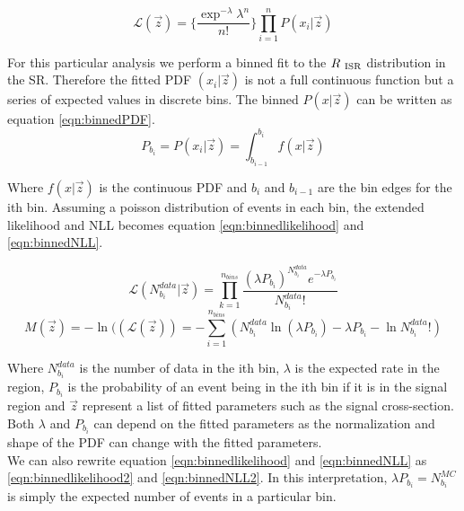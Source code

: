 \begin{equation}
\label{eqn:ExtLikelihood}
{\mathcal{L}}(\vec{z}) = \{ \frac{\exp^{-\lambda}{\lambda}^n}{n!} \}  {\displaystyle\prod_{i=1}^{n}} P(x_i|\vec{z})
\end{equation}

\indent For this particular analysis we perform a binned fit to the $R_{~\mathrm{ISR}}$ distribution in the SR.  Therefore the fitted PDF $(x_i|\vec{z})$ is not a full continuous function but a series of expected values in discrete bins.  The binned $P(x|\vec{z})$ can be written as equation \ref{eqn:binnedPDF}. \\

\begin{equation}
\label{eqn:binnedPDF}
P_{b_i} = P(x_i|\vec{z}) = \int^{b_i}_{b_{i-1}} f(x|\vec{z})
\end{equation}

Where $f(x|\vec{z})$ is the continuous PDF and $b_i$ and $b_{i-1} $ are the bin edges for the ith bin. Assuming a poisson distribution of events in each bin, the extended likelihood and NLL becomes equation \ref{eqn:binnedlikelihood} and \ref{eqn:binnedNLL}.

\begin{equation}
\label{eqn:binnedlikelihood}
{\mathcal{L}}(N^{data}_{b_i}|\vec{z}) = {\displaystyle\prod_{k=1}^{n_{bins}} \frac{({\lambda}P_{b_i})^{N^{data}_{b_i}}e^{-{\lambda}P_{b_i}}}{N^{data}_{b_i}!}} 
\end{equation}
\begin{equation}
\label{eqn:binnedNLL}
M(\vec{z})=-\ln(({\mathcal{L}}(\vec{z})) = -{\displaystyle\sum_{i=1}^{n_{bins}}} ( N^{data}_{b_i} \ln( {\lambda}P_{b_i} ) - {\lambda}P_{b_i} - \ln{N^{data}_{b_i}!} )
\end{equation}

\indent Where $N^{data}_{b_i}$ is the number of data in the ith bin, $\lambda$ is the expected rate in the region, $P_{b_i}$ is the probability of an event being in the ith bin if it is in the signal region and $\vec{z}$ represent a list of fitted parameters such as the signal cross-section.   Both $\lambda$ and $P_{b_i}$ can depend on the fitted parameters as the normalization and shape of the PDF can change with the fitted parameters. \\

\indent We can also rewrite  equation \ref{eqn:binnedlikelihood} and \ref{eqn:binnedNLL} as \ref{eqn:binnedlikelihood2} and \ref{eqn:binnedNLL2}.  In this interpretation, ${\lambda}P_{b_i}=N^{MC}_{b_i}$ is simply the expected number of events in a particular bin.  \\

